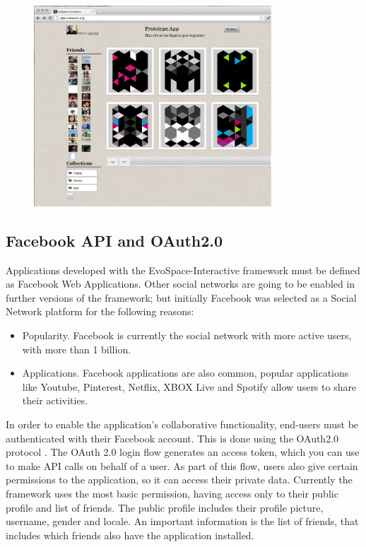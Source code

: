 \documentclass{sig-alternate}
\begin{document}
\begin{figure}[!t]
    \centering
        \includegraphics[width=3.5in]{EvoApp.eps}
    \caption{}
    \label{fig:web}
\end{figure}

\subsection{Facebook API and OAuth2.0}
Applications developed with the EvoSpace-Interactive framework must be defined as Facebook Web Applications. Other social networks are going to be enabled in further versions of the framework; but initially Facebook was selected as a Social Network platform for the following reasons:
\begin{itemize}
	\item Popularity. Facebook is currently the social network with more active users, with more than 1 billion.

	\item Applications. Facebook applications are also common, popular applications like Youtube, Pinterest, Netflix, XBOX Live and Spotify allow users to share their activities.	
\end{itemize}
In order to enable the application's collaborative functionality, end-users must be authenticated with their Facebook account. This is done using the OAuth2.0 protocol \cite{hammer2011oauth}. The OAuth 2.0 login flow generates an access token, which you can use to make API calls on behalf of a user. As part of this flow, users also give certain permissions to the application, so it can access their private data. Currently the framework uses the most basic permission, having access only to their public profile and list of friends. The public profile includes their profile picture, username, gender and locale. An important information is the list of friends, that includes which friends also have the application installed.
\end{document}
